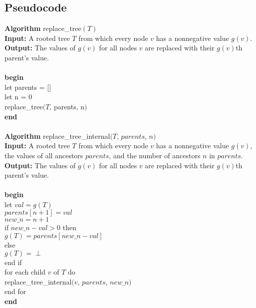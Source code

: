 \documentclass{article}
\begin{document}
    \subsection{Pseudocode}
      \textbf{Algorithm} replace\_tree$(T)$\\
      \textbf{Input:} A rooted tree $T$ from which every node $v$ has a nonnegative value $g(v)$.\\
      \textbf{Output:} The values of $g(v)$ for all nodes $v$ are replaced with their $g(v)$th parent's value.\\
      \\
      \textbf{begin}\\
      let parents = []\\
      let n = 0\\
      replace\_tree$(T$, parents, n$)$\\      
      \textbf{end}\\
      \\
      \textbf{Algorithm} replace\_tree\_internal$(T$, $parents$, $n)$\\
      \textbf{Input:} A rooted tree $T$ from which every node $v$ has a nonnegative value $g(v)$, the values of all ancestors $parents$, and the number of ancestors $n$ in $parents$.\\
      \textbf{Output:} The values of $g(v)$ for all nodes $v$ are replaced with their $g(v)$th parent's value.\\
      \\
      \textbf{begin}\\
      let $val = g(T)$\\
      $parents[n+1] = val$\\
      $new\_n = n + 1$\\
      if $new\_n - val > 0$ then\\
      \indent $g(T) = parents[new\_n - val]$\\
      else\\
      \indent $g(T) = \perp$\\
      end if\\
      for each child $v$ of $T$ do\\
      \indent replace\_tree\_internal$(v$, $parents$, $new\_n)$\\
      end for\\
      \textbf{end}
\end{document}
